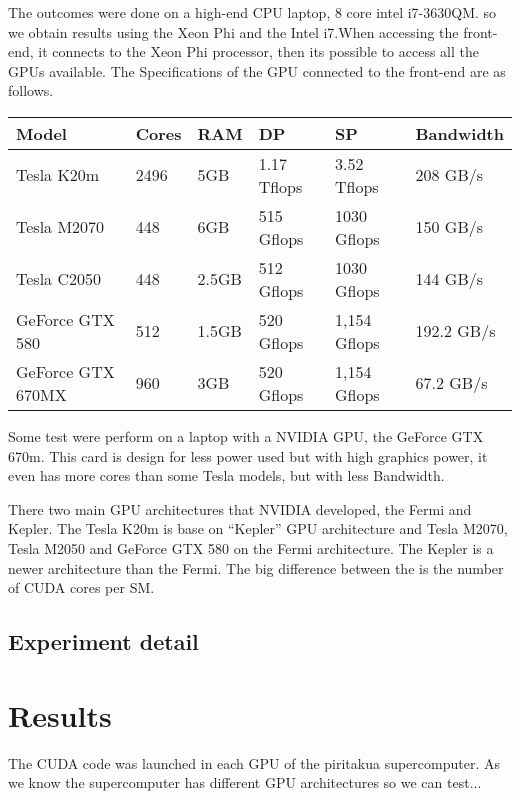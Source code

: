   The outcomes  were done on a high-end CPU laptop, 8 core intel i7-3630QM.  so we obtain results using the Xeon Phi and the Intel i7.When accessing the front-end, it connects to the Xeon Phi processor, then its possible to access all the GPUs available. The Specifications of the GPU connected to the front-end are as follows.
  
  \begin{tabular}{ |  l  |  l  |  l  |  l  |  l  | l | }      
    \hline
    Model & Cores & RAM & DP & SP & Bandwidth \\
    \hline
    Tesla K20m & 2496 & 5GB & 1.17 Tflops & 3.52 Tflops & 208 GB/s \\
   \hline
    Tesla M2070 & 448 & 6GB & 515 Gflops & 1030 Gflops & 150 GB/s \\
   \hline
     Tesla C2050 & 448 & 2.5GB & 512 Gflops & 1030 Gflops & 144 GB/s \\
   \hline
      GeForce GTX 580 & 512 & 1.5GB & 520 Gflops & 1,154 Gflops & 192.2 GB/s \\
   \hline
   GeForce GTX 670MX & 960 & 3GB & 520 Gflops & 1,154 Gflops & 67.2 GB/s \\
   \hline
  \end{tabular}
  
  Some test were perform on a laptop with a NVIDIA GPU, the GeForce GTX 670m. This card is design for less power used but with high graphics power, it even has more cores than some Tesla models, but with less Bandwidth.
  
There two main GPU architectures that NVIDIA developed, the Fermi and Kepler. The Tesla K20m is base on ``Kepler'' GPU architecture and Tesla M2070, Tesla M2050 and GeForce GTX 580 on the Fermi architecture. The Kepler is a newer architecture than the Fermi. The big difference between the is the number of CUDA cores per SM.
  
  
 \subsection{Experiment detail}  

\section{Results}

The CUDA code was launched in each GPU of the piritakua supercomputer. As we know the supercomputer has different GPU architectures so we can test...




